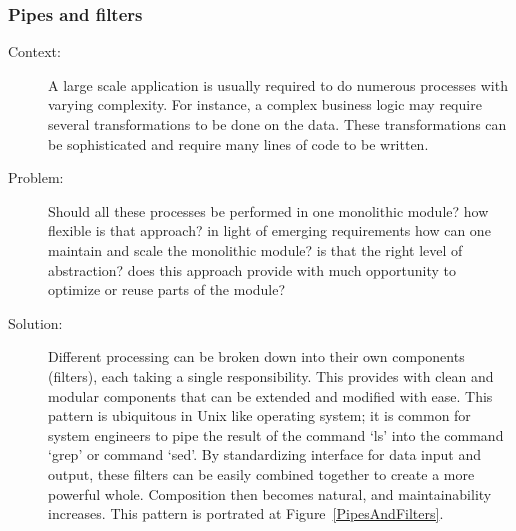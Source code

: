 \documentclass{bmcart}
\begin{document}



\subsubsection{Pipes and filters}

\begin{description}
  \item[Context:] A large scale application is usually required to do numerous processes with varying complexity. For instance, a complex business logic may require several transformations to be done on the data. These transformations can be sophisticated and require many lines of code to be written.
  \item[Problem:] Should all these processes be performed in one monolithic module? how flexible is that approach? in light of emerging requirements how can one maintain and scale the monolithic module? is that the right level of abstraction? does this approach provide with much opportunity to optimize or reuse parts of the module? 
  \item[Solution:] Different processing can be broken down into their own components (filters), each taking a single responsibility. This provides with clean and modular components that can be extended and modified with ease. This pattern is ubiquitous in Unix like operating system; it is common for system engineers to pipe the result of the command `ls' into the command `grep' or command `sed'. By standardizing interface for data input and output, these filters can be easily combined together to create a more powerful whole. Composition then becomes natural, and maintainability increases. This pattern is portrated at Figure~\ref{PipesAndFilters}.   
\end{description}
\end{document}
